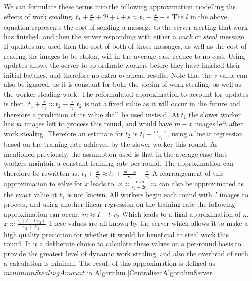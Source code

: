 \documentclass[12pt]{article}
\begin{document}
We can formulate these terms into the following approximation modelling the effects of work stealing.
\newline
$t_1 + \frac{x}{r_1} + 2l + i + s \approx t_2 - \frac{x}{r_2} + s$
\newline
The $l$ in the above equation represents the cost of sending a message to the server alerting that work has finished, and then the server responding with either a $nack$ or $steal$ message.
\newline
If updates are used then the cost of both of those messages, as well as the cost of reading the images to be stolen, will in the average case reduce to no cost. Using updates allows the server to co-ordinate workers before they have finished their initial batches, and therefore no extra overhead results. Note that the $s$ value can also be ignored, as it is constant for both the victim of work stealing, as well as the worker stealing work.
\newline
The reformulated approximation to account for updates is then.
\newline
$t_1 + \frac{x}{r_1} \approx t_2 - \frac{x}{r_2}$
\newline
$t_2$ is not a fixed value as it will occur in the future and therefore a prediction of its value shall be used instead. At $t_1$ the slower worker has $m$ images left to process this round, and would have $m -x $ images left after work stealing. Therefore an estimate for $t_2$ is $t_1 + \frac{m-x}{r_2}$, using a linear regression based on the training rate achieved by the slower worker this round. As mentioned previously, the assumption used is that in the average case that workers maintain a constant training rate per round.
\newline
The approximation can therefore be rewritten as.
\newline
$t_1 + \frac{x}{r_1} \approx t_1 + \frac{m-x}{r_2} - \frac{x}{r_2}$
\newline
A rearrangement of this approximation to solve for $x$ leads to.
\newline
$x \approx \frac{r_1m}{r_2 + 2r_1}$
\newline
$m$ can also be approximated as the exact value at $t_1$ is not known. All workers begin each round with $I$ images to process, and using another linear regression on the training rate the following approximation can occur.
\newline
$m \approx I - t_1r_2$
\newline
Which leads to a final approximation of x.
\newline
$x \approx \frac{r_1(I - t_1r_2)}{r_2 + 2r_1}$
\newline
These values are all known by the server which allows it to make a high quality prediction for whether it would be beneficial to steal work this round. It is a deliberate choice to calculate these values on a per-round basis to provide the greatest level of dynamic work stealing, and also the overhead of such a calculation is minimal. The result of this approximation is defined as $minimumStealingAmount$ in Algorithm \ref{CentralisedAlgorithmServer}.
\end{document}
